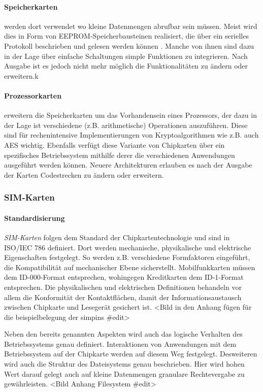 \paragraph{Speicherkarten} werden dort verwendet wo kleine Datenmengen abrufbar
sein müssen. Meist wird dies in Form von \ac{EEPROM}-Speicherbausteinen realisiert,
die über ein serielles Protokoll beschrieben und gelesen werden können \cite{spitz11}.
Manche von ihnen sind dazu in der Lage über einfache Schaltungen simple Funktionen
zu integrieren. Nach Ausgabe ist es jedoch nicht mehr möglich die Funktionalitäten
zu ändern oder erweitern.k

\paragraph{Prozessorkarten} erweitern die Speicherkarten um das Vorhandensein
eines Prozessors, der dazu in der Lage ist verschiedene (z.B. arithmetische)
Operationen auszuführen. Diese sind für rechenintensive Implementierungen
von Kryptoalgorithmen wie z.B. auch AES wichtig. Ebenfalls verfügt diese
Variante von Chipkarten über ein spezifisches Betriebssystem mithilfe derer
die verschiedenen Anwendungen ausgeführt werden können.
Neuere Architekturen erlauben es nach der Ausgabe der Karten Codestrecken
zu ändern oder erweitern.

\subsubsection{SIM-Karten}

\paragraph{Standardisierung}
\textit{SIM-Karten} folgen dem Standard der Chipkartentechnologie und sind in
ISO/IEC 786 definiert. Dort werden mechanische, physikalische und elektrische
Eigenschaften festgelegt.
So werden z.B. verschiedene Formfaktoren eingeführt, die Kompatibilität
auf mechanischer Ebene sicherstellt. Mobilfunkkarten müssen dem ID-000-Format
entsprechen, wohingegen Kreditkarten dem ID-1-Format entsprechen. Die physikalischen und elektrischen
Definitionen behandeln vor allem die Konformität der Kontaktflächen, damit
der Informationsaustausch zwischen Chipkarte und Lesegerät gesichert ist.
<Bild in den Anhang fügen für die beispielbelegung der simpins \#edit>

Neben den bereits genannten Aspekten wird auch das logische Verhalten des Betriebssystems
genau definiert. Interaktionen von Anwendungen mit dem Betriebssystem auf der Chipkarte
werden auf diesem Weg festgelegt. Desweiteren wird auch die Struktur des Dateisystems
genau beschrieben. Hier wird hohen Wert darauf gelegt auch auf kleine Datenmengen
granulare Rechtevergabe zu gewährleisten. <Bild Anhang Filesystem \#edit>

